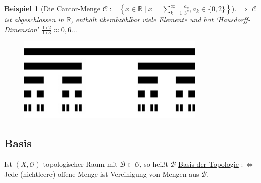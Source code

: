 \documentclass[a4paper,11pt,notitlepage]{report}
\newtheorem{example}{Beispiel}[chapter]
\newcommand{\R}{{\ensuremath{\mathbb{R}}}}
\newcommand{\OO}{{\ensuremath{\mathcal{O}}}}
\newenvironment{Kasten}[1]
{
\hspace{0.05\linewidth}
\begin{center}
\begin{minipage}{0.9\linewidth}
\setlength{\fboxsep}{10pt}
\definecolor{shadecolor}{gray}{1}
\definecolor{framecolor}{gray}{0}
\def\FrameCommand{\fcolorbox{framecolor}{shadecolor}}
\MakeFramed {\FrameRestore}
\subsection{#1}
\begin{itshape}
}
{
\end{itshape}
\endMakeFramed
\end{minipage}
\end{center}
}
\begin{document}
\begin{example}[Die \underline{Cantor-Menge} $\mathcal{C}:= \left \{ x \in \R \mid x = \sum\limits_{k=1}^{\infty}{\frac{a_k}{3^k}}, a_k \in \{0,2\} \right \}$]
	$\Rightarrow$ $\mathcal{C}$ ist abgeschlossen in $\R$, enthält überabzählbar viele Elemente und hat `Hausdorff-Dimension' $\frac{\ln 2}{\ln 3} \approx 0,6 \ldots$
\end{example}

\begin{figure}[h]
\centering
\includegraphics[width=0.8\textwidth]{images/Cantormenge_5te_Iteration.jpg}
\end{figure}

\begin{Kasten}{Basis}
	Ist $(X, \OO)$ topologischer Raum mit $\mathcal{B} \subset \OO$, so heißt $\mathcal{B}$ \underline{Basis der Topologie} $:\Leftrightarrow$ Jede (nichtleere) offene Menge ist Vereinigung von Mengen aus $\mathcal{B}$.
\end{Kasten}
\end{document}
